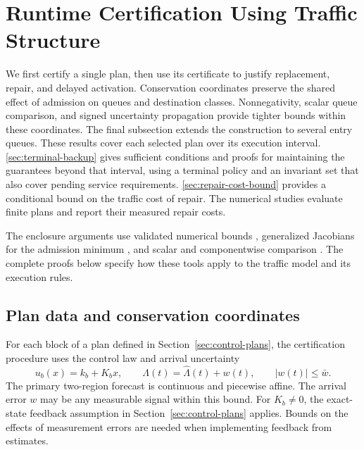 \documentclass[preprint,12pt]{elsarticle}
\theoremstyle{definition}
\theoremstyle{plain}
\theoremstyle{definition}
\theoremstyle{plain}
\newcommand{\appref}[1]{\ref{#1}}
\begin{document}
\FloatBarrier
\section{Runtime Certification Using Traffic Structure}
\label{sec:new-certification}


We first certify a single plan, then use its certificate to justify
replacement, repair, and delayed activation. Conservation coordinates
preserve the shared effect of admission on queues and destination classes.
Nonnegativity, scalar queue comparison, and signed uncertainty propagation
provide tighter bounds within these coordinates. The final subsection
extends the construction to several entry queues. These results cover
each selected plan over its execution interval. \appref{sec:terminal-backup}
gives sufficient conditions and proofs for maintaining the guarantees
beyond that interval, using a terminal policy and an invariant set that
also cover pending service requirements. \appref{sec:repair-cost-bound}
provides a conditional bound on the traffic cost of repair. The numerical
studies evaluate finite plans and report their measured repair costs.

The enclosure arguments use validated numerical bounds
\cite{tucker2011validated}, generalized Jacobians for the admission
minimum \cite{clarke1990optimization}, and scalar and componentwise
comparison \cite{khalil2002nonlinear,farina2000positive}.
The complete proofs below specify how these tools apply to the traffic
model and its execution rules.

\subsection{Plan data and conservation coordinates}

For each block of a plan defined in Section~\ref{sec:control-plans},
the certification procedure uses the control law and arrival uncertainty
\begin{equation}
 u_b(x)=k_b+K_bx,
 \qquad \Lambda(t)=\widehat\Lambda(t)+w(t),
 \qquad |w(t)|\le\bar w.
 \label{eq:new-plan-data}
\end{equation}
The primary two-region forecast is continuous and piecewise affine.
The arrival error $w$ may be any measurable signal within this bound.
For $K_b\ne0$, the exact-state feedback assumption in
Section~\ref{sec:control-plans} applies. Bounds on the effects of
measurement errors are needed when implementing feedback from estimates.
\end{document}
